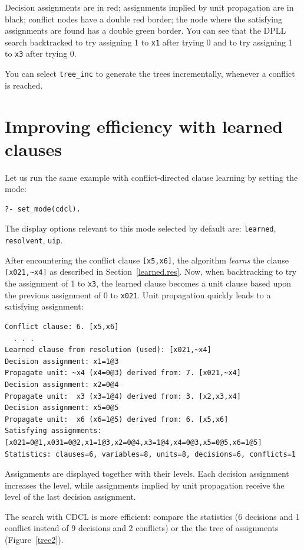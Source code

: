 \documentclass[11pt]{article}
\newcommand*{\p}[1]{\textup{\texttt{#1}}}
\begin{document}
Decision assignments are in red; assignments implied by unit propagation
are in black; conflict nodes have a double red border; the node where
the satisfying assignments are found has a double green border.
You can see that the DPLL search backtracked to try assigning 1 to
\p{x1} after trying 0 and to try assigning 1 to \p{x3} after trying 0.

You can select \p{tree\_inc} to generate the trees incrementally,
whenever a conflict is reached.


\section{Improving efficiency with learned clauses}

Let us run the same example with conflict-directed clause learning by setting the mode:

\begin{verbatim}
?- set_mode(cdcl).
\end{verbatim}

The display options relevant to this mode selected by default are:
\p{learned}, \p{resolvent}, \p{uip}.

After encountering the conflict clause \verb+[x5,x6]+, the algorithm
\emph{learns} the clause \verb+[x021,~x4]+ as described in
Section~\ref{learned.res}. Now, when backtracking to try the assignment
of 1 to \p{x3}, the learned clause becomes a unit clause based upon the
previous assignment of 0 to \p{x021}. Unit propagation quickly leads to
a satisfying assignment:

\begin{verbatim}
Conflict clause: 6. [x5,x6]
  . . .
Learned clause from resolution (used): [x021,~x4]
Decision assignment: x1=1@3
Propagate unit: ~x4 (x4=0@3) derived from: 7. [x021,~x4]
Decision assignment: x2=0@4
Propagate unit:  x3 (x3=1@4) derived from: 3. [x2,x3,x4]
Decision assignment: x5=0@5
Propagate unit:  x6 (x6=1@5) derived from: 6. [x5,x6]
Satisfying assignments:
[x021=0@1,x031=0@2,x1=1@3,x2=0@4,x3=1@4,x4=0@3,x5=0@5,x6=1@5]
Statistics: clauses=6, variables=8, units=8, decisions=6, conflicts=1
\end{verbatim}
Assignments are displayed together with their levels. Each decision
assignment increases the level, while assignments implied by unit
propagation receive the level of the last decision assignment. 

The search with CDCL is more efficient: compare the statistics (6
decisions and 1 conflict instead of 9 decisions and 2 conflicts) or the
the tree of assignments (Figure~\ref{tree2}).
\end{document}
